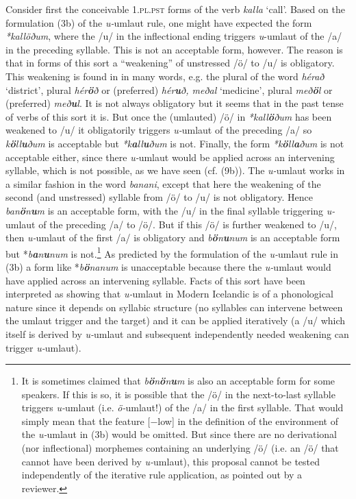 \documentclass[output=paper,
modfonts
]{LSP/langsci}
\begin{document}
\noindent Consider first the conceivable \textsc{1.pl.pst} forms of the verb
\emph{kalla} `call'. Based on the formulation (3b) of the
\emph{u-}umlaut rule, one might have expected the form \emph{*kallöðum},
where the /u/ in the inflectional ending triggers \emph{u}-umlaut of the
/a/ in the preceding syllable. This is not an acceptable form, however.
The reason is that in forms of this sort a ``weakening'' of unstressed
/ö/ to /u/ is obligatory. This weakening is found in in many words, e.g.
the plural of the word \emph{hérað} `district', plural
\emph{hér\textbf{ö}ð} or (preferred) \emph{hér\textbf{u}ð, meðal}
`medicine', plural \emph{með\textbf{ö}l} or (preferred)
\emph{með\textbf{u}l}. It is not always obligatory but it seems that in
the past tense of verbs of this sort it is. But once the (umlauted) /ö/
in \emph{*kall\textbf{ö}ðum} has been weakened to /u/ it obligatorily
triggers \emph{u-}umlaut of the preceding /a/ so
\emph{k\textbf{ö}ll\textbf{u}ðum} is acceptable but
\emph{*k\textbf{a}ll\textbf{u}ðum} is not. Finally, the form
\emph{*k\textbf{ö}ll\textbf{a}ðum} is not acceptable either, since there
\emph{u-}umlaut would be applied across an intervening syllable, which
is not possible, as we have seen (cf. (9b)). The \emph{u-}umlaut works
in a similar fashion in the word \emph{banani}, except that here the
weakening of the second (and unstressed) syllable from /ö/ to /u/ is not
obligatory. Hence \emph{ban\textbf{ö}n\textbf{u}m} is an acceptable
form, with the /u/ in the final syllable triggering \emph{u-}umlaut of
the preceding /a/ to /ö/. But if this /ö/ is further weakened to /u/,
then \emph{u-}umlaut of the first /a/ is obligatory and
\emph{b\textbf{ö}n\textbf{u}num} is an acceptable form but
*\emph{b\textbf{a}n\textbf{u}num} is not.\footnote{It is sometimes
  claimed that \emph{b\textbf{ö}n\textbf{ö}n\textbf{u}m} is also an
  acceptable form for some speakers. If this is so, it is possible that
  the /ö/ in the next-to-last syllable triggers \emph{u-}umlaut (i.e.
  \emph{ö-}umlaut!) of the /a/ in the first syllable. That would simply
  mean that the feature {[}−low{]} in the definition of the environment
  of the \emph{u-}umlaut in (3b) would be omitted. But since there are
  no derivational (nor inflectional) morphemes containing an underlying
  /ö/ (i.e. an /ö/ that cannot have been derived by \emph{u-}umlaut),
  this proposal cannot be tested independently of the iterative rule
  application, as pointed out by a reviewer.} As predicted by the
formulation of the \emph{u-}umlaut rule in (3b) a form like
*\emph{b\textbf{ö}nanum} is unacceptable because there the
\emph{u-}umlaut would have applied across an intervening syllable. Facts
of this sort have been interpreted as showing that \emph{u-}umlaut in
Modern Icelandic is of a phonological nature since it depends on
syllabic structure (no syllables can intervene between the umlaut
trigger and the target) and it can be applied iteratively (a /u/ which
itself is derived by \emph{u-}umlaut and subsequent independently needed
weakening can trigger \emph{u-}umlaut).
\end{document}
